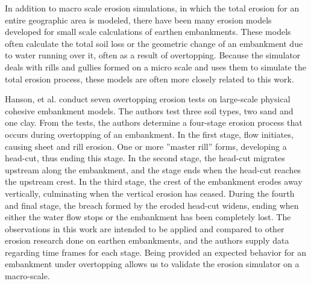 
In addition to macro scale erosion simulations, in which the total erosion for an entire geographic area is modeled, there have been many erosion models developed for small scale calculations of earthen embankments. These models often calculate the total soil loss or the geometric change of an embankment due to water running over it, often as a result of overtopping. Because the simulator deals with rills and gullies formed on a micro scale and uses them to simulate the total erosion process, these models are often more closely related to this work.

Hanson, et al. \cite{Hanson-PhysicalModeling} conduct seven overtopping erosion tests on large-scale physical cohesive embankment models. The authors test three soil types, two sand and one clay. From the tests, the authors determine a four-stage erosion process that occurs during overtopping of an embankment. In the first stage, flow initiates, causing sheet and rill erosion. One or more ''master rill'' forms, developing a head-cut, thus ending this stage. In the second stage, the head-cut migrates upstream along the embankment, and the stage ends when the head-cut reaches the upstream crest. In the third stage, the crest of the embankment erodes away vertically, culminating when the vertical erosion has ceased. During the fourth and final stage, the breach formed by the eroded head-cut widens, ending when either the water flow stops or the embankment has been completely lost. The observations in this work are intended to be applied and compared to other erosion research done on earthen embankments, and the authors supply data regarding time frames for each stage. Being provided an expected behavior for an embankment under overtopping allows us to validate the erosion simulator on a macro-scale. 

